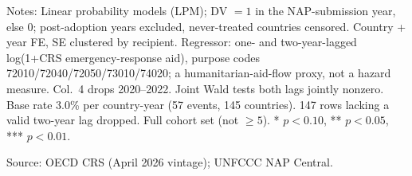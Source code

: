 \begin{table}[H]
\centering
\caption{NAP submission timing and lagged emergency-response aid}
\label{tab:nap_timing_humanitarian_aid}
\par\vspace{4pt}
\begin{minipage}{\linewidth}\footnotesize
Notes: Linear probability models (LPM); DV $= 1$ in the NAP-submission year, else 0; post-adoption years excluded, never-treated countries censored. Country + year FE, SE clustered by recipient. Regressor: one- and two-year-lagged log(1+CRS emergency-response aid), purpose codes 72010/72040/72050/73010/74020; a humanitarian-aid-flow proxy, not a hazard measure. Col.\ 4 drops 2020--2022. Joint Wald tests both lags jointly nonzero. Base rate 3.0\% per country-year (57 events, 145 countries). 147 rows lacking a valid two-year lag dropped. Full cohort set (not $\geq 5$). * $p<0.10$, ** $p<0.05$, *** $p<0.01$.\par
Source: OECD CRS (April 2026 vintage); UNFCCC NAP Central.
\end{minipage}
\end{table}
